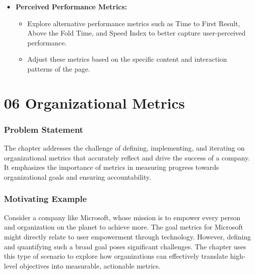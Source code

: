 \documentclass{article}
\begin{document}
\begin{itemize}
    \item \textbf{Perceived Performance Metrics:}
    \begin{itemize}
        \item Explore alternative performance metrics such as Time to First Result, Above the Fold Time, and Speed Index to better capture user-perceived performance.
        \item Adjust these metrics based on the specific content and interaction patterns of the page.
    \end{itemize}
\end{itemize}

\section*{06 Organizational Metrics}
\subsubsection*{Problem Statement}
The chapter addresses the challenge of defining, implementing, and iterating on organizational metrics that accurately reflect and drive the success of a company. It emphasizes the importance of metrics in measuring progress towards organizational goals and ensuring accountability.

\subsubsection*{Motivating Example}
Consider a company like Microsoft, whose mission is to empower every person and organization on the planet to achieve more. The goal metrics for Microsoft might directly relate to user empowerment through technology. However, defining and quantifying such a broad goal poses significant challenges. The chapter uses this type of scenario to explore how organizations can effectively translate high-level objectives into measurable, actionable metrics.
\end{document}
